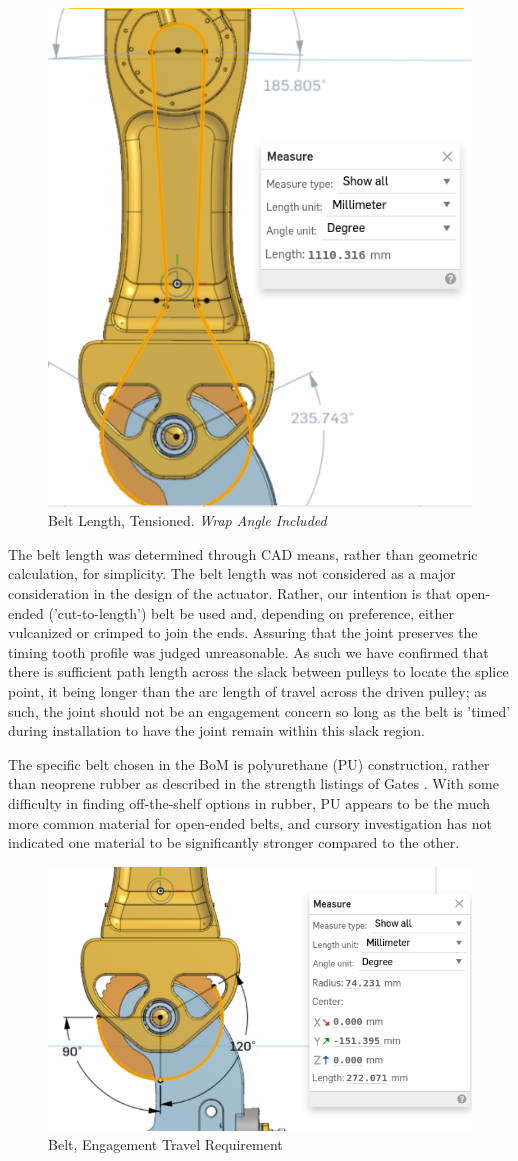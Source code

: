 \documentclass{article}
\begin{document}
\begin{figure}
    \centering
    \includegraphics[width=0.5\linewidth]{assets/BoMPurchasedParts/MOHRA_BeltLength_Tensioned.png}
    \caption{Belt Length, Tensioned. \textit{Wrap Angle Included}}
    \label{fig:enter-label}
\end{figure}

The belt length was determined through CAD means, rather than geometric calculation, for simplicity. The belt length was not considered as a major consideration in the design of the actuator. Rather, our intention is that open-ended ('cut-to-length') belt be used and, depending on preference, either vulcanized or crimped to join the ends. Assuring that the joint preserves the timing tooth profile was judged unreasonable. As such we have confirmed that there is sufficient path length across the slack between pulleys to locate the splice point, it being longer than the arc length of travel across the driven pulley; as such, the joint should not be an engagement concern so long as the belt is 'timed' during installation to have the joint remain within this slack region.

The specific belt chosen in the BoM is polyurethane (PU) construction, rather than neoprene rubber as described in the strength listings of Gates \cite{gates_synchronous_nodate}. With some difficulty in finding off-the-shelf options in rubber, PU appears to be the much more common material for open-ended belts, and cursory investigation has not indicated one material to be significantly stronger compared to the other. 

\begin{figure}
    \centering
    \includegraphics[width=0.5\linewidth]{assets/BoMPurchasedParts/MOHRA_BeltLength_MaxTravel.png}
    \caption{Belt, Engagement Travel Requirement}
    \label{fig:enter-label}
\end{figure}
\end{document}
